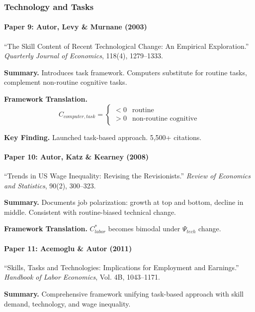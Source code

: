 \subsubsection{Technology and Tasks}

\paragraph{Paper 9: Autor, Levy \& Murnane (2003)}

``The Skill Content of Recent Technological Change: An Empirical Exploration.''
\textit{Quarterly Journal of Economics}, 118(4), 1279--1333.

\textbf{Summary.}
Introduces task framework. Computers substitute for routine tasks, complement 
non-routine cognitive tasks.

\textbf{Framework Translation.}
\begin{equation}
C_{computer, task} = 
\begin{cases} 
< 0 & \text{routine} \\
> 0 & \text{non-routine cognitive}
\end{cases}
\end{equation}

\textbf{Key Finding.}
Launched task-based approach. 5,500+ citations.

\paragraph{Paper 10: Autor, Katz \& Kearney (2008)}

``Trends in US Wage Inequality: Revising the Revisionists.''
\textit{Review of Economics and Statistics}, 90(2), 300--323.

\textbf{Summary.}
Documents job polarization: growth at top and bottom, decline in middle.
Consistent with routine-biased technical change.

\textbf{Framework Translation.}
$C^*_{labor}$ becomes bimodal under $\Psi_{tech}$ change.

\paragraph{Paper 11: Acemoglu \& Autor (2011)}

``Skills, Tasks and Technologies: Implications for Employment and Earnings.''
\textit{Handbook of Labor Economics}, Vol. 4B, 1043--1171.

\textbf{Summary.}
Comprehensive framework unifying task-based approach with skill demand, 
technology, and wage inequality.

